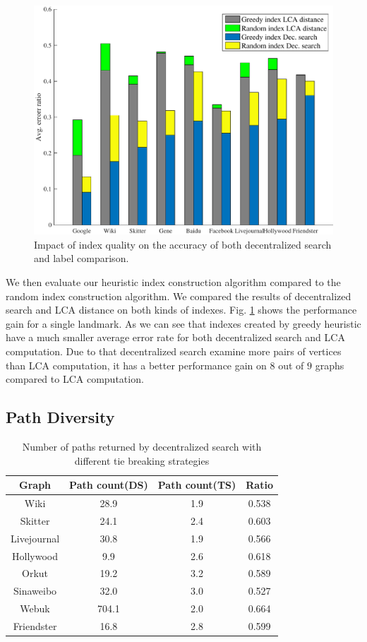 \begin{figure}[t]
    \centering
    \includegraphics[width=\linewidth]{./figures/accuracy_index.pdf}
    \caption{Impact of index quality on the accuracy of both decentralized search and label comparison.}
    \label{fig:accuracy_index}
\end{figure}

We then evaluate our heuristic index construction algorithm compared to the random index construction algorithm. We compared the results of decentralized search and LCA distance on both kinds of indexes. Fig. \ref{fig:accuracy_index} shows the performance gain for a single landmark. As we can see that indexes created by greedy heuristic have a much smaller average error rate for both decentralized search and LCA computation. Due to that decentralized search examine more pairs of vertices than LCA computation, it has a better performance gain on $8$ out of $9$ graphs compared to LCA computation.

\subsection{Path Diversity}
\label{eval_diversity}

\begin{table} [ht]
    \centering
    \begin{tabular}{cccc} \hline
				Graph&Path count(DS)&Path count(TS)&Ratio \\ \hline
				Wiki&28.9&1.9&0.538 \\ \hline
				Skitter&24.1&2.4&0.603 \\ \hline
				Livejournal&30.8&1.9&0.566 \\ \hline
				Hollywood&9.9&2.6&0.618 \\ \hline
				Orkut&19.2&3.2&0.589 \\ \hline
				Sinaweibo&32.0&3.0&0.527 \\ \hline
				Webuk&704.1&2.0&0.664 \\ \hline
				Friendster&16.8&2.8&0.599 \\
    \end{tabular}
    \caption{Number of paths returned by decentralized search with different tie breaking strategies}
    \label{table:NOP}
\end{table}

